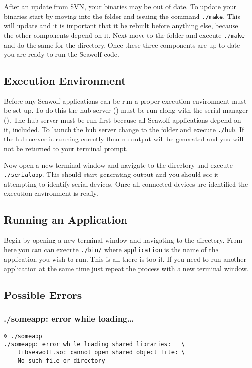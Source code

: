 After an update from SVN, your binaries may be out of date. To update your
binaries start by moving into the  folder and issuing the
command \texttt{./make}. This will update \libseawolf{} and it is important that
it be rebuilt before anything else, because the other components depend on
it. Next move to the  folder and execute \texttt{./make} and do
the same for the  directory. Once these three components
are up-to-date you are ready to run the Seawolf code.

\subsection{Execution Environment} \label{runningenviron}
Before any Seawolf applications can be run a proper execution environment must
be set up. To do this the hub server () must be run along with the
serial manager (). The hub server must be run first because all
Seawolf applications depend on it,  included. To launch the hub
server change to the  folder and execute \texttt{./hub}. If
the hub server is running corretly then no output will be generated and you will
not be returned to your terminal prompt. 

Now open a new terminal window and navigate to the  directory and
execute \texttt{./serialapp}. This should start generating output and you should
see it attempting to identify serial devices. Once all connected devices are
identified the execution environment is ready.

\subsection{Running an Application} \label{runningapp}
Begin by opening a new terminal window and navigating to the
 directory. From here you can can execute
\texttt{./bin/} where \texttt{application} is the name of
the application you wish to run. This is all there is too it. If you need to run
another application at the same time just repeat the process with a new terminal
window.

\subsection{Possible Errors} \label{runningerror}
\subsubsection{./someapp: error while loading\ldots{}}
\begin{lstlisting}
% ./someapp
./someapp: error while loading shared libraries:   \ 
    libseawolf.so: cannot open shared object file: \
    No such file or directory
\end{lstlisting}

